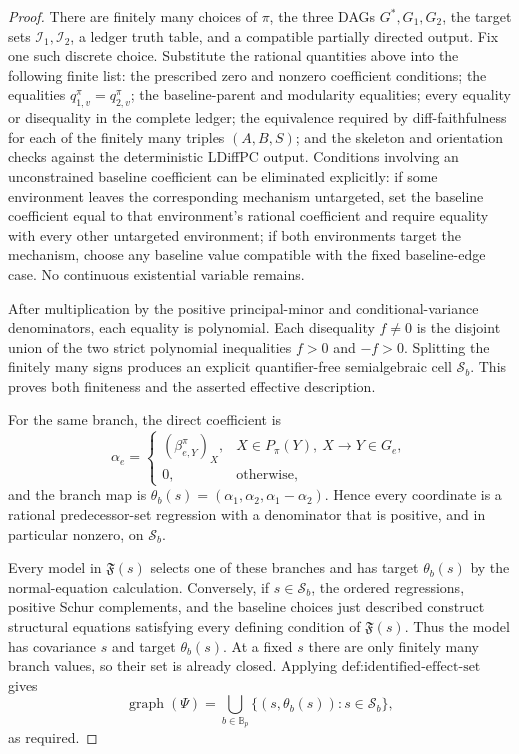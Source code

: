 \documentclass{article}
\begin{document}
\begin{proof}
There are finitely many choices of \(\pi\), the three DAGs \(G^*,G_1,G_2\), the target sets \(\mathcal I_1,\mathcal I_2\), a ledger truth table, and a compatible partially directed output.  Fix one such discrete choice.  Substitute the rational quantities above into the following finite list: the prescribed zero and nonzero coefficient conditions; the equalities \(q_{1,v}^{\pi}=q_{2,v}^{\pi}\); the baseline-parent and modularity equalities; every equality or disequality in the complete ledger; the equivalence required by diff-faithfulness for each of the finitely many triples \((A,B,S)\); and the skeleton and orientation checks against the deterministic LDiffPC output.  Conditions involving an unconstrained baseline coefficient can be eliminated explicitly: if some environment leaves the corresponding mechanism untargeted, set the baseline coefficient equal to that environment's rational coefficient and require equality with every other untargeted environment; if both environments target the mechanism, choose any baseline value compatible with the fixed baseline-edge case.  No continuous existential variable remains.

After multiplication by the positive principal-minor and conditional-variance denominators, each equality is polynomial.  Each disequality \(f\ne0\) is the disjoint union of the two strict polynomial inequalities \(f>0\) and \(-f>0\).  Splitting the finitely many signs produces an explicit quantifier-free semialgebraic cell \(\mathcal S_b\).  This proves both finiteness and the asserted effective description.

For the same branch, the direct coefficient is
\[
 \alpha_e=
 \begin{cases}
  (\beta_{e,Y}^{\pi})_X,&X\in P_\pi(Y),\ X\to Y\in G_e,\\
  0,&\text{otherwise},
 \end{cases}
\]
and the branch map is \(\theta_b(s)=(\alpha_1,\alpha_2,\alpha_1-\alpha_2)\).  Hence every coordinate is a rational predecessor-set regression with a denominator that is positive, and in particular nonzero, on \(\mathcal S_b\).

Every model in \(\mathfrak F(s)\) selects one of these branches and has target \(\theta_b(s)\) by the normal-equation calculation.  Conversely, if \(s\in\mathcal S_b\), the ordered regressions, positive Schur complements, and the baseline choices just described construct structural equations satisfying every defining condition of \(\mathfrak F(s)\).  Thus the model has covariance \(s\) and target \(\theta_b(s)\).  At a fixed \(s\) there are only finitely many branch values, so their set is already closed.  Applying \(\text{def:identified-effect-set}\) gives
\[
 \operatorname{graph}(\Psi)
 =\bigcup_{b\in\mathbb B_p}
   \{(s,\theta_b(s)):s\in\mathcal S_b\},
\]
as required.
\end{proof}
\end{document}
